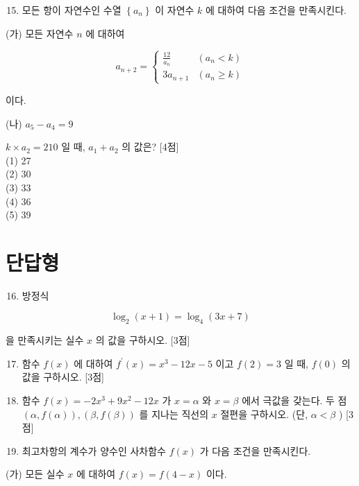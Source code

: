 \documentclass[10pt]{article}
\begin{document}
\begin{enumerate}
  \setcounter{enumi}{14}
  \item 모든 항이 자연수인 수열 \(\left\{a_{n}\right\}\) 이 자연수 \(k\) 에 대하여 다음 조건을 만족시킨다.
\end{enumerate}

(가) 모든 자연수 \(n\) 에 대하여

\[
a_{n+2}= \begin{cases}\frac{12}{a_{n}} & \left(a_{n}<k\right) \\ 3 a_{n+1} & \left(a_{n} \geq k\right)\end{cases}
\]

이다.

(나) \(a_{5}-a_{4}=9\)

\(k \times a_{2}=210\) 일 때, \(a_{1}+a_{2}\) 의 값은? [4점]\\
(1) 27\\
(2) 30\\
(3) 33\\
(4) 36\\
(5) 39

\section*{단답형}
\begin{enumerate}
  \setcounter{enumi}{15}
  \item 방정식
\end{enumerate}

\[
\log _{2}(x+1)=\log _{4}(3 x+7)
\]

을 만족시키는 실수 \(x\) 의 값을 구하시오. [3점]

\begin{enumerate}
  \setcounter{enumi}{16}
  \item 함수 \(f(x)\) 에 대하여 \(f^{\prime}(x)=x^{3}-12 x-5\) 이고 \(f(2)=3\) 일 때, \(f(0)\) 의 값을 구하시오. [3점]

  \item 함수 \(f(x)=-2 x^{3}+9 x^{2}-12 x\) 가 \(x=\alpha\) 와 \(x=\beta\) 에서 극값을 갖는다. 두 점 \((\alpha, f(\alpha)),(\beta, f(\beta))\) 를 지나는 직선의 \(x\) 절편을 구하시오. (단, \(\alpha<\beta\) ) [3점]

  \item 최고차항의 계수가 양수인 사차함수 \(f(x)\) 가 다음 조건을 만족시킨다.

\end{enumerate}

(가) 모든 실수 \(x\) 에 대하여 \(f(x)=f(4-x)\) 이다.
\end{document}
